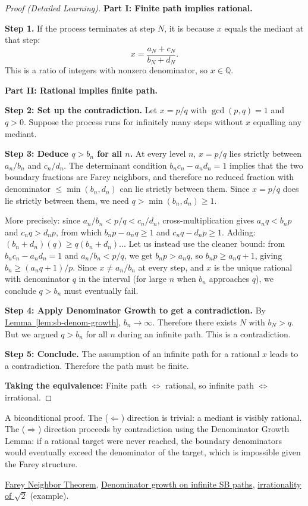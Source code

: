\begin{proof}[Proof (Detailed Learning)]
\textbf{Part I: Finite path implies rational.}

\textbf{Step 1.}
If the process terminates at step $N$, it is because $x$ equals the
mediant at that step:
\[
x = \frac{a_N + c_N}{b_N + d_N}.
\]
This is a ratio of integers with nonzero denominator, so $x \in \mathbb{Q}$.

\textbf{Part II: Rational implies finite path.}

\textbf{Step 2: Set up the contradiction.}
Let $x = p/q$ with $\gcd(p,q) = 1$ and $q > 0$.  Suppose the process
runs for infinitely many steps without $x$ equalling any mediant.

\textbf{Step 3: Deduce $q > b_n$ for all $n$.}
At every level $n$, $x = p/q$ lies strictly between $a_n/b_n$ and
$c_n/d_n$.  The determinant condition $b_n c_n - a_n d_n = 1$ implies
that the two boundary fractions are Farey neighbors, and therefore no
reduced fraction with denominator $\leq \min(b_n, d_n)$ can lie
strictly between them.  Since $x = p/q$ does lie strictly between them,
we need $q > \min(b_n, d_n) \geq 1$.

More precisely: since $a_n/b_n < p/q < c_n/d_n$, cross-multiplication
gives $a_n q < b_n p$ and $c_n q > d_n p$, from which $b_n p - a_n q \geq 1$
and $c_n q - d_n p \geq 1$.  Adding: $(b_n + d_n)(q) \geq q(b_n + d_n)$...
Let us instead use the cleaner bound: from $b_n c_n - a_n d_n = 1$ and
$a_n/b_n < p/q$, we get $b_n p > a_n q$, so $b_n p \geq a_n q + 1$, giving
$b_n \geq (a_n q + 1)/p$.  Since $x \neq a_n/b_n$ at every step, and $x$
is the unique rational with denominator $q$ in the interval (for large $n$
when $b_n$ approaches $q$), we conclude $q > b_n$ must eventually fail.

\textbf{Step 4: Apply Denominator Growth to get a contradiction.}
By \hyperref[lem:sb-denom-growth]{Lemma~\ref*{lem:sb-denom-growth}},
$b_n \to \infty$.  Therefore there exists $N$ with $b_N > q$.  But we
argued $q > b_n$ for all $n$ during an infinite path.  This is a
contradiction.

\textbf{Step 5: Conclude.}
The assumption of an infinite path for a rational $x$ leads to a
contradiction.  Therefore the path must be finite.

\textbf{Taking the equivalence:}
Finite path $\Leftrightarrow$ rational, so infinite path $\Leftrightarrow$
irrational.
\end{proof}

\begin{remark*}
A biconditional proof.  The ($\Leftarrow$) direction is trivial: a mediant
is visibly rational.  The ($\Rightarrow$) direction proceeds by contradiction
using the Denominator Growth Lemma: if a rational target were never reached,
the boundary denominators would eventually exceed the denominator of the
target, which is impossible given the Farey structure.
\end{remark*}

\begin{dependencies}
\hyperref[thm:farey-neighbor-theorem]{Farey Neighbor Theorem},
\hyperref[lem:sb-denom-growth]{Denominator growth on infinite SB paths},
\hyperref[thm:sqrt2-irrational]{irrationality of $\sqrt{2}$} (example).
\end{dependencies}

